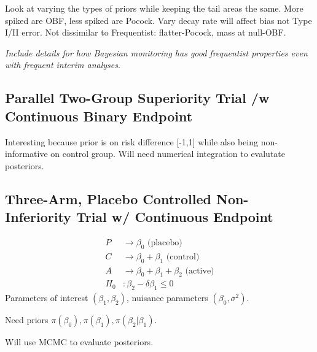 \documentclass[12pt]{article}
\begin{document}
Look at varying the types of priors while keeping the tail areas the same. More spiked are OBF, less spiked are Pocock.
Vary decay rate will affect bias not Type I/II error. Not dissimilar to Frequentist: flatter-Pocock, mass at null-OBF.

\textit{Include details for how Bayesian monitoring has good frequentist properties even with frequent interim analyses}.





\subsection{Parallel Two-Group Superiority Trial /w Continuous Binary Endpoint}
Interesting because prior is on risk difference [-1,1] while also being non-informative on control group. Will need numerical integration to evalutate posteriors.
\subsection{Three-Arm, Placebo Controlled Non-Inferiority Trial w/ Continuous Endpoint}
\begin{align*}
P&\rightarrow\beta_0 \text{ (placebo)}\\
C&\rightarrow\beta_0+\beta_1 \text{ (control)}\\
A&\rightarrow\beta_0+\beta_1+\beta_2 \text{ (active)}\\
H_0&:\beta_2-\delta\beta_1\leq 0
\end{align*}
Parameters of interest $(\beta_1,\beta_2)$, nuisance parameters $(\beta_0,\sigma^2)$.

Need priors $\pi(\beta_0), \pi(\beta_1), \pi(\beta_2|\beta_1)$. 

Will use MCMC to evaluate posteriors.
\end{document}
